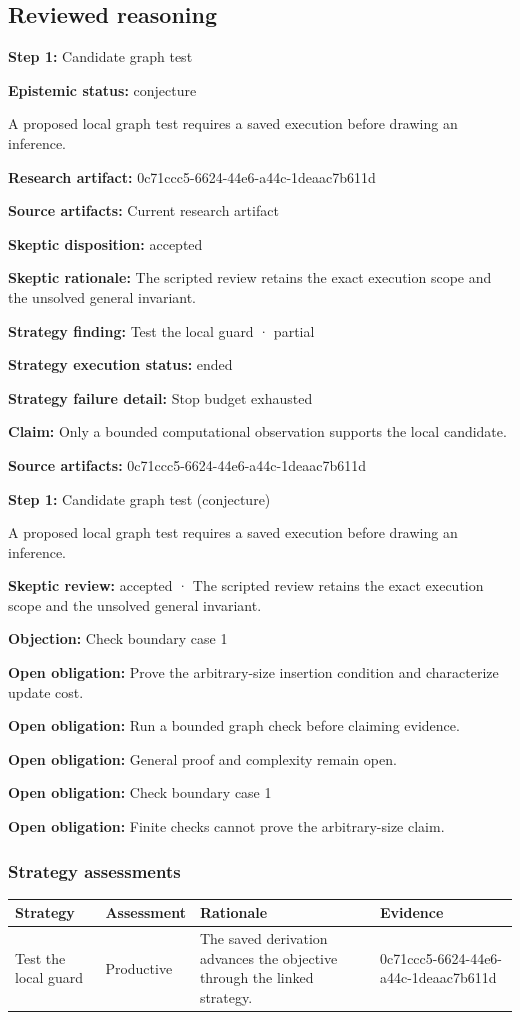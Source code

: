 \documentclass[11pt]{article}
\begin{document}
\subsection{Reviewed reasoning}
\textbf{Step 1:} Candidate graph test\par
\textbf{Epistemic status:} conjecture\par
A proposed local graph test requires a saved execution before drawing an inference.\par
\textbf{Research artifact:} 0c71ccc5-6624-44e6-a44c-1deaac7b611d\par
\textbf{Source artifacts:} Current research artifact\par
\textbf{Skeptic disposition:} accepted\par
\textbf{Skeptic rationale:} The scripted review retains the exact execution scope and the unsolved general invariant.\par
\textbf{Strategy finding:} Test the local guard · partial\par
\textbf{Strategy execution status:} ended\par
\textbf{Strategy failure detail:} Stop budget exhausted\par
\textbf{Claim:} Only a bounded computational observation supports the local candidate.\par
\textbf{Source artifacts:} 0c71ccc5-6624-44e6-a44c-1deaac7b611d\par
\textbf{Step 1:} Candidate graph test (conjecture)\par
A proposed local graph test requires a saved execution before drawing an inference.\par
\textbf{Skeptic review:} accepted · The scripted review retains the exact execution scope and the unsolved general invariant.\par
\textbf{Objection:} Check boundary case 1\par
\textbf{Open obligation:} Prove the arbitrary-size insertion condition and characterize update cost.\par
\textbf{Open obligation:} Run a bounded graph check before claiming evidence.\par
\textbf{Open obligation:} General proof and complexity remain open.\par
\textbf{Open obligation:} Check boundary case 1\par
\textbf{Open obligation:} Finite checks cannot prove the arbitrary-size claim.\par
\subsubsection*{Strategy assessments}
\begin{longtable}{>{\raggedright\arraybackslash}p{.16\linewidth}>{\raggedright\arraybackslash}p{.15\linewidth}>{\raggedright\arraybackslash}p{.40\linewidth}>{\raggedright\arraybackslash}p{.17\linewidth}}
\toprule Strategy & Assessment & Rationale & Evidence \\
\midrule\endhead
Test the local guard & Productive & The saved derivation advances the objective through the linked strategy. & 0c71ccc5-6624-44e6-a44c-1deaac7b611d \\
\bottomrule
\end{longtable}
\end{document}
